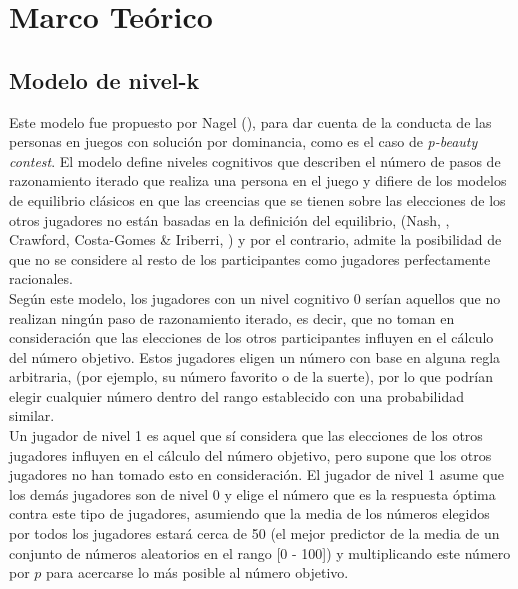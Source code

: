 \chapter{Marco Teórico} %

\label{Cap_SDT} %


\newcommand{\keyword}[1]{\textbf{#1}}
\newcommand{\tabhead}[1]{\textbf{#1}}
\newcommand{\code}[1]{\texttt{#1}}
\newcommand{\file}[1]{\texttt{\bfseries#1}}
\newcommand{\option}[1]{\texttt{\itshape#1}}


\section{Modelo de nivel-k}

Este modelo fue propuesto por Nagel (\citeyear{Nagel}), para dar cuenta de la conducta de las personas en juegos con solución por dominancia, como es el caso de \textit{p-beauty contest}. El modelo define niveles cognitivos que describen el número de pasos de razonamiento iterado que realiza una persona en el juego y difiere de los modelos de equilibrio clásicos en que las creencias que se tienen sobre las elecciones de los otros jugadores no están basadas en la definición del equilibrio, (Nash, \citeyear{Nash}, Crawford, Costa-Gomes & Iriberri, \citeyear{Crawford}) y por el contrario, admite la posibilidad de que no se considere al resto de los participantes como jugadores perfectamente racionales.\\ 

Según este modelo, los jugadores con un nivel cognitivo 0 serían aquellos que no realizan ningún paso de razonamiento iterado, es decir, que no toman en consideración que las elecciones de los otros participantes influyen en el cálculo del número objetivo. Estos jugadores eligen un número con base en alguna regla arbitraria, (por ejemplo, su número favorito o de la suerte), por lo que podrían elegir cualquier número dentro del rango establecido con una probabilidad similar.\\

Un jugador de nivel 1 es aquel que sí considera que las elecciones de los otros jugadores influyen en el cálculo del número objetivo, pero supone que los otros jugadores no han tomado esto en consideración. El jugador de nivel 1 asume que los demás jugadores son de nivel 0 y elige el número que es la respuesta óptima contra este tipo de jugadores, asumiendo que la media de los números elegidos por todos los jugadores estará cerca de 50 (el mejor predictor de la media de un conjunto de números aleatorios en el rango [0 - 100]) y multiplicando este número por $p$ para acercarse lo más posible al número objetivo.\\

